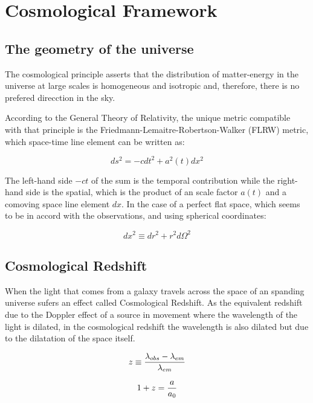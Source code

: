 \chapter{Cosmological Framework}

\section{The geometry of the universe}

The cosmological principle asserts that the distribution of matter-energy in the universe at large scales is homogeneous and isotropic and, therefore, there is no prefered direcction in the sky.

According to the General Theory of Relativity, the unique metric compatible with that principle is the Friedmann-Lemaitre-Robertson-Walker (FLRW) metric, which space-time line element can be written as:  

\begin{equation}
ds^2 = -cdt^2 + a^2(t)dx^2
\end{equation}

The left-hand side $-ct$ of the sum is the temporal contribution while the right-hand side is the spatial, which is the product of an scale factor $a(t)$ and a comoving space line element $dx$. In the case of a perfect flat space, which seems to be in accord with the observations, and using spherical coordinates:

\begin{equation}
dx^2 \equiv dr^2 + r^2d\Omega^2
\end{equation}

\section{Cosmological Redshift}
When the light that comes from a galaxy travels across the space of an spanding universe sufers an effect called Cosmological Redshift. As the equivalent redshift due to the Doppler effect of a source in movement where the wavelength of the light is dilated, in the cosmological redshift the wavelength is also dilated but due to the dilatation of the space itself.

\begin{equation}
z \equiv {\lambda_{obs} - \lambda_{em} \over \lambda_{em}}
\end{equation} 

\begin{equation}
1 + z = {a \over a_0}
\end{equation} 

